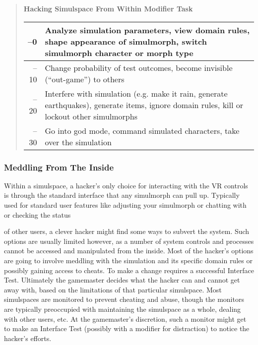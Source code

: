 \begin{quotation} \textbf{Hacking Simulspace From Within Modifier Task} \\ \begin{tabularx}{\textwidth}{|rX|} \hline

–0 &Analyze simulation parameters, view domain rules, shape appearance of simulmorph, switch simulmorph character or morph type \\ \hline

–10 &Change probability of test outcomes, become invisible (“out-game”) to others \\ \hline

–20 &Interfere with simulation (e.g. make it rain, generate earthquakes), generate items, ignore domain rules, kill or lockout other simulmorphs \\ \hline

–30 &Go into god mode, command simulated characters, take over the simulation \\ \hline

\end{tabularx} \end{quotation} 

\subsubsection{Meddling From The Inside} 

Within a simulspace, a hacker's only choice for interacting with the VR controls is through the standard interface that any simulmorph can pull up. Typically used for standard user features like adjusting your simulmorph or chatting with or checking the status 

of other users, a clever hacker might find some ways to subvert the system. Such options are usually limited however, as a number of system controls and processes cannot be accessed and manipulated from the inside. Most of the hacker's options are going to involve meddling with the simulation and its specific domain rules or possibly gaining access to cheats. To make a change requires a successful Interface Test. Ultimately the gamemaster decides what the hacker can and cannot get away with, based on the limitations of that particular simulspace. Most simulspaces are monitored to prevent cheating and abuse, though the monitors are typically preoccupied with maintaining the simulspace as a whole, dealing with other users, etc. At the gamemaster's discretion, such a monitor might get to make an Interface Test (possibly with a modifier for distraction) to notice the hacker's efforts. 

